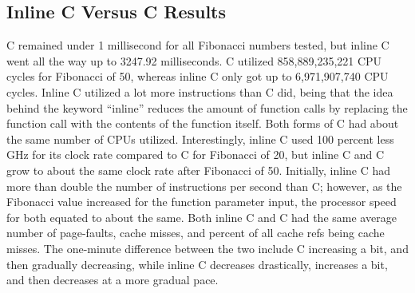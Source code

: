 \documentclass{sig-alternate}
\begin{document}
\subsection{Inline C Versus C Results}
C remained under 1 millisecond for all Fibonacci numbers tested, but inline C went all the way up to 3247.92 milliseconds. C utilized 858,889,235,221 CPU cycles for Fibonacci of 50, whereas inline C only got up to 6,971,907,740 CPU cycles. Inline C utilized a lot more instructions than C did, being that the idea behind the keyword “inline” reduces the amount of function calls by replacing the function call with the contents of the function itself. Both forms of C had about the same number of CPUs utilized. Interestingly, inline C used 100 percent less GHz for its clock rate compared to C for Fibonacci of 20, but inline C and C grow to about the same clock rate after Fibonacci of 50. Initially, inline C had more than double the number of instructions per second than C; however, as the Fibonacci value increased for the function parameter input, the processor speed for both equated to about the same. Both inline C and C had the same average number of page-faults, cache misses, and percent of all cache refs being cache misses. The one-minute difference between the two include C increasing a bit, and then gradually decreasing, while inline C decreases drastically, increases a bit, and then decreases at a more gradual pace.
\end{document}
